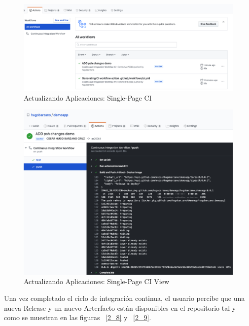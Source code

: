\documentclass[a4paper,11pt]{book}
\begin{document}
  \begin{figure}[H]
\centering
\includegraphics[scale=0.3]{imagenes/casouso_a/2_6.png}
\caption{  Actualizando Aplicaciones: Single-Page CI }
\label{2_6}
\end{figure}

  \begin{figure}[H]
\centering
\includegraphics[scale=0.4]{imagenes/casouso_a/2_7.png}
\caption{ Actualizando Aplicaciones: Single-Page CI View  }
\label{2_7}
\end{figure}

 Una vez completado el ciclo de integración continua, el usuario percibe que una nueva Release y un nuevo Arterfacto están disponibles en el repositorio tal y como se muestran en las figuras ~\ref{2_8} y ~\ref{2_9}. 
 
\end{document}
